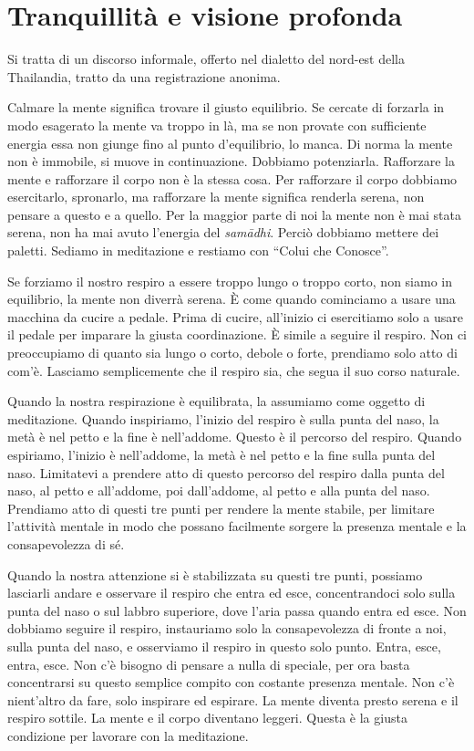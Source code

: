 \chapter{Tranquillità e visione profonda}

\begin{openingQuote}
  \centering

  Si tratta di un discorso informale, offerto nel dialetto del nord-est della
  Thailandia, tratto da una registrazione anonima.
\end{openingQuote}

Calmare la mente significa trovare il giusto equilibrio. Se cercate di
forzarla in modo esagerato la mente va troppo in là, ma se non provate
con sufficiente energia essa non giunge fino al punto d'equilibrio, lo
manca. Di norma la mente non è immobile, si muove in continuazione.
Dobbiamo potenziarla. Rafforzare la mente e rafforzare il corpo non è la
stessa cosa. Per rafforzare il corpo dobbiamo esercitarlo, spronarlo, ma
rafforzare la mente significa renderla serena, non pensare a questo e a
quello. Per la maggior parte di noi la mente non è mai stata serena, non
ha mai avuto l'energia del \emph{samādhi}. Perciò dobbiamo mettere dei
paletti. Sediamo in meditazione e restiamo con ``Colui che Conosce''.

Se forziamo il nostro respiro a essere troppo lungo o troppo corto, non
siamo in equilibrio, la mente non diverrà serena. È come quando
cominciamo a usare una macchina da cucire a pedale. Prima di cucire,
all'inizio ci esercitiamo solo a usare il pedale per imparare la giusta
coordinazione. È simile a seguire il respiro. Non ci preoccupiamo di
quanto sia lungo o corto, debole o forte, prendiamo solo atto di com'è.
Lasciamo semplicemente che il respiro sia, che segua il suo corso
naturale.

Quando la nostra respirazione è equilibrata, la assumiamo come oggetto
di meditazione. Quando inspiriamo, l'inizio del respiro è sulla punta
del naso, la metà è nel petto e la fine è nell'addome. Questo è il
percorso del respiro. Quando espiriamo, l'inizio è nell'addome, la metà
è nel petto e la fine sulla punta del naso. Limitatevi a prendere atto
di questo percorso del respiro dalla punta del naso, al petto e
all'addome, poi dall'addome, al petto e alla punta del naso. Prendiamo
atto di questi tre punti per rendere la mente stabile, per limitare
l'attività mentale in modo che possano facilmente sorgere la presenza
mentale e la consapevolezza di sé.

Quando la nostra attenzione si è stabilizzata su questi tre punti,
possiamo lasciarli andare e osservare il respiro che entra ed esce,
concentrandoci solo sulla punta del naso o sul labbro superiore, dove
l'aria passa quando entra ed esce. Non dobbiamo seguire il respiro,
instauriamo solo la consapevolezza di fronte a noi, sulla punta del
naso, e osserviamo il respiro in questo solo punto. Entra, esce, entra,
esce. Non c'è bisogno di pensare a nulla di speciale, per ora basta
concentrarsi su questo semplice compito con costante presenza mentale.
Non c'è nient'altro da fare, solo inspirare ed espirare. La mente
diventa presto serena e il respiro sottile. La mente e il corpo
diventano leggeri. Questa è la giusta condizione per lavorare con la
meditazione.

